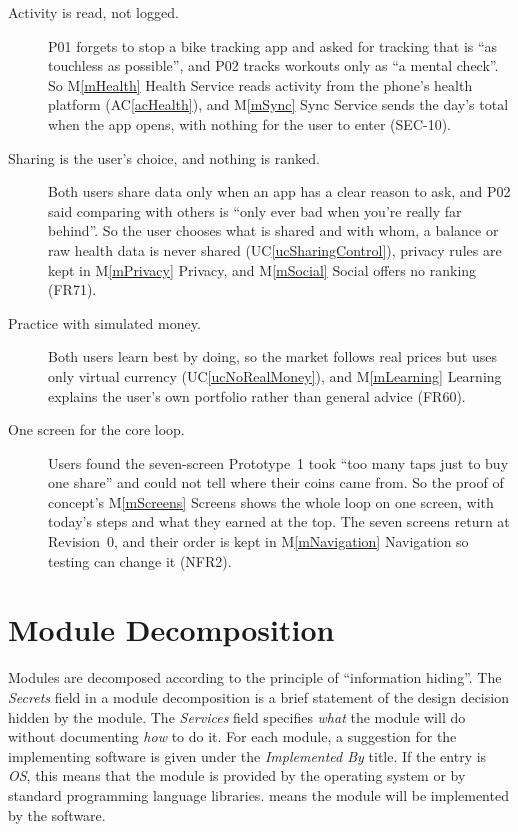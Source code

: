 \documentclass[12pt, titlepage]{article}
\newcommand{\acref}[1]{AC\ref{#1}}
\newcommand{\uref}[1]{UC\ref{#1}}
\newcommand{\mref}[1]{M\ref{#1}}
\begin{document}
\begin{description}
\item[Activity is read, not logged.] P01 forgets to stop a bike tracking app
  and asked for tracking that is ``as touchless as possible'', and P02 tracks
  workouts only as ``a mental check''. So \mref{mHealth} Health Service reads
  activity from the phone's health platform (\acref{acHealth}), and
  \mref{mSync} Sync Service sends the day's total when the app opens, with
  nothing for the user to enter (SEC-10).

\item[Sharing is the user's choice, and nothing is ranked.] Both users share
  data only when an app has a clear reason to ask, and P02 said comparing with
  others is ``only ever bad when you're really far behind''. So the user
  chooses what is shared and with whom, a balance or raw health data is never
  shared (\uref{ucSharingControl}), privacy rules are kept in \mref{mPrivacy}
  Privacy, and \mref{mSocial} Social offers no ranking (FR71).

\item[Practice with simulated money.] Both users learn best by doing, so the
  market follows real prices but uses only virtual currency
  (\uref{ucNoRealMoney}), and \mref{mLearning} Learning explains the user's own
  portfolio rather than general advice (FR60).

\item[One screen for the core loop.] Users found the seven-screen Prototype~1
  took ``too many taps just to buy one share'' and could not tell where their
  coins came from. So the proof of concept's \mref{mScreens} Screens shows the
  whole loop on one screen, with today's steps and what they earned at the
  top. The seven screens return at Revision~0, and their order is kept in
  \mref{mNavigation} Navigation so testing can change it (NFR2).
\end{description}

\section{Module Decomposition} \label{SecMD}

Modules are decomposed according to the principle of ``information
hiding''. The \emph{Secrets} field in a module
decomposition is a brief statement of the design decision hidden by the
module. The \emph{Services} field specifies \emph{what} the module will do
without documenting \emph{how} to do it. For each module, a suggestion for the
implementing software is given under the \emph{Implemented By} title. If the
entry is \emph{OS}, this means that the module is provided by the operating
system or by standard programming language libraries.  \emph{\progname{}} means the
module will be implemented by the \progname{} software.
\end{document}
